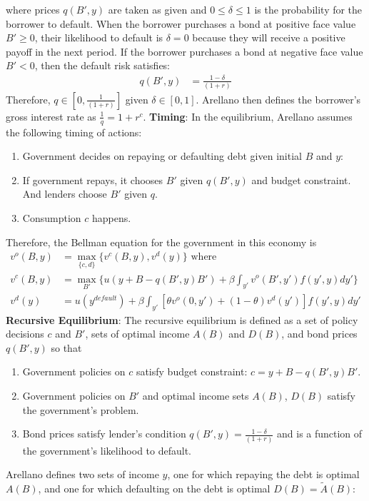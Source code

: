 \documentclass[12pt]{article}
\begin{document}
where prices $q(B', y)$ are taken as given and $0 \le \delta \le 1$ is the probability for the borrower to default. When the borrower purchases a bond at positive face value $B' \ge 0$, their likelihood to default is $\delta = 0$ because they will receive a positive payoff in the next period. If the borrower purchases a bond at negative face value $B' < 0$, then the default risk satisfies:
\begin{align*}
    q(B', y) &= \frac{1-\delta}{(1+r)}
\end{align*}
Therefore, $q \in [0, \frac{1}{(1+r)}]$ given $\delta \in [0, 1]$. Arellano then defines the borrower's gross interest rate as $\frac{1}{q} = 1 + r^c$.
\clearpage
\noindent \textbf{Timing}: In the equilibrium, Arellano assumes the following timing of actions:
\begin{enumerate}
    \item Government decides on repaying or defaulting debt given initial $B$ and $y$:
    \item If government repays, it chooses $B'$ given $q(B', y)$ and budget constraint. And lenders choose $B'$ given $q$.
    \item Consumption $c$ happens.
\end{enumerate}
Therefore, the Bellman equation for the government in this economy is
\begin{align*}
    v^o(B, y) &= \max_{\{c,d\}} \{ v^c(B, y), v^d(y) \} \text{ where } \\
    v^c(B, y) &= \max_{B'} \{ u(y + B - q(B', y)B') + \beta \int_{y'} v^o(B', y')f(y', y) dy'\} \\
    v^d(y) &= u(y^{default}) + \beta \int_{y'} [\theta v^o(0, y') + (1-\theta)v^d(y')]f(y', y) dy'
\end{align*}
\noindent \textbf{Recursive Equilibrium}: The recursive equilibrium is defined as a set of policy decisions $c$ and $B'$, sets of optimal income $A(B)$ and $D(B)$, and bond prices $q(B', y)$ so that
\begin{enumerate}
    \item Government policies on $c$ satisfy budget constraint: $c = y + B - q(B', y)B'$.
    \item Government policies on $B'$ and optimal income sets $A(B)$, $D(B)$ satisfy the government's problem.
    \item Bond prices satisfy lender's condition $q(B', y) = \frac{1-\delta}{(1+r)}$ and is a function of the government's likelihood to default.
\end{enumerate}
Arellano defines two sets of income $y$, one for which repaying the debt is optimal $A(B)$, and one for which defaulting on the debt is optimal $D(B) = \tilde{A}(B)$:
\end{document}

